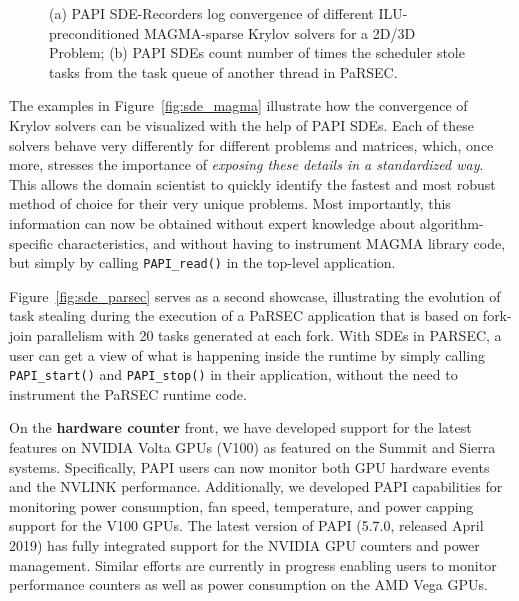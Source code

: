 \begin{figure}[!h]
\begin{center}
\end{center}
\vspace{-9pt}
\caption{(a) PAPI SDE-Recorders log convergence of different ILU-preconditioned MAGMA-sparse Krylov solvers for a 2D/3D Problem; (b) PAPI SDEs count number of times the scheduler stole tasks from the task queue of another thread in PaRSEC.}
\end{figure}
%
%
The examples in Figure~\ref{fig:sde_magma} illustrate how the convergence of Krylov solvers can be
visualized with the help of PAPI SDEs. Each of these solvers behave very differently 
for different problems and matrices, which, once more, stresses the importance of 
\emph{exposing these details in a standardized way}. This allows the domain
scientist to quickly identify the fastest and most robust method of choice for 
their very unique problems. Most importantly, this information can now be obtained without 
expert knowledge about algorithm-specific characteristics,
and without having to instrument MAGMA library code, but simply by calling \verb+PAPI_read()+
in the top-level application.

Figure~\ref{fig:sde_parsec} serves as a second showcase, illustrating the evolution of 
task stealing during the execution of a PaRSEC application that is based on 
fork-join parallelism with 20 tasks generated at each fork.
With SDEs in PARSEC, a user can get a view of what is happening inside the runtime
by simply calling \verb+PAPI_start()+ and \verb+PAPI_stop()+ in their application, without the need to
instrument the PaRSEC runtime code. 


\vspace{10pt}
On the \textbf{hardware counter} front, we have developed support for the latest 
features on NVIDIA Volta GPUs (V100) as featured on the Summit and Sierra systems.
Specifically, PAPI users can now monitor both GPU hardware events and the NVLINK performance. 
Additionally, we developed PAPI capabilities for monitoring power consumption, fan speed, 
temperature, and power capping support for the V100 GPUs. 
The latest version of PAPI (5.7.0, released April 2019) has fully integrated support for the 
NVIDIA GPU counters and power management.
Similar efforts are currently in progress enabling users to monitor performance counters 
as well as power consumption on the AMD Vega GPUs.


